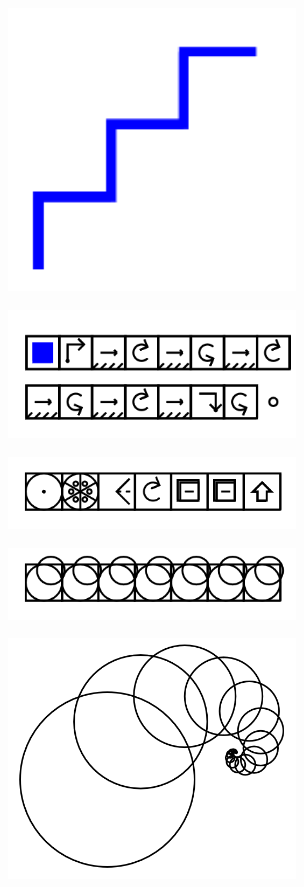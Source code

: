 \documentclass[11pt]{article}
\begin{document}
\includegraphics[width=3in]{image35.png}

\includegraphics[width=3in]{image36.png}





\includegraphics[width=3in]{image37.png}

\includegraphics[width=3in]{image38.png}

\includegraphics[width=3in]{image39.png}
\end{document}
